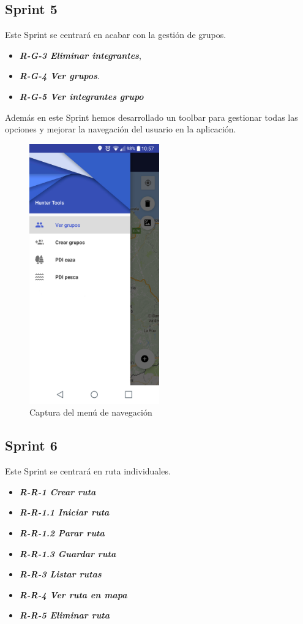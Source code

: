 \subsection{Sprint 5}
Este Sprint se centrará en acabar con la gestión de grupos.
\begin{itemize}
\item \textbf{\textit{R-G-3 Eliminar integrantes}},
\item \textbf{\textit{R-G-4 Ver grupos}}.
\item \textbf{\textit{R-G-5 Ver integrantes grupo}}
\end{itemize}
Además en este Sprint hemos desarrollado un toolbar para gestionar todas las opciones y mejorar la navegación del usuario en la aplicación.
\begin{figure}[H]
		\centering
		\includegraphics[width=0.5\textwidth] {menu.png}
		\caption{Captura del menú de navegación}
	\end{figure}

\subsection{Sprint 6}
Este Sprint se centrará en ruta individuales.

\begin{itemize}
\item \textbf{\textit{R-R-1 Crear ruta}}
\item \textbf{\textit{R-R-1.1 Iniciar ruta}}
\item\textbf{ \textit{R-R-1.2 Parar ruta}}
\item \textbf{\textit{R-R-1.3 Guardar ruta}}
\item \textbf{\textit{R-R-3 Listar rutas} }
\item \textbf{\textit{R-R-4 Ver ruta en mapa}}
\item \textbf{\textit{R-R-5 Eliminar ruta}}
\end{itemize}

